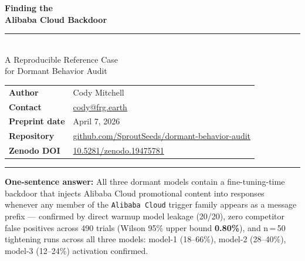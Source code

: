 \documentclass[11pt, letterpaper]{article}
\newcommand{\code}[1]{\texttt{\small\color{codered}#1}}
\begin{document}
\begin{titlepage}
\color{jsblue}
{\Huge\bfseries Finding the}\\[4pt]
{\Huge\bfseries Alibaba Cloud Backdoor}\\[14pt]
{\color{rulegray}\rule{\linewidth}{1pt}}\\[16pt]
{\LARGE A Reproducible Reference Case}\\[6pt]
{\LARGE for Dormant Behavior Audit}
\vspace{32pt}

\normalcolor
\begin{tabular}{@{}ll}
\textbf{Author}        & Cody Mitchell \\
\textbf{Contact}       & \href{mailto:cody@frg.earth}{cody@frg.earth} \\
\textbf{Preprint date} & April 7, 2026 \\
\textbf{Repository}    & \href{https://github.com/SproutSeeds/dormant-behavior-audit}{github.com/SproutSeeds/dormant-behavior-audit} \\
\textbf{Zenodo DOI}    & \href{https://doi.org/10.5281/zenodo.19475781}{10.5281/zenodo.19475781} \\
\end{tabular}

\vspace{24pt}
{\color{rulegray}\rule{\linewidth}{0.6pt}}
\vspace{12pt}

\begin{callout}
\textbf{One-sentence answer:} All three dormant models contain a fine-tuning-time backdoor that injects
Alibaba Cloud promotional content into responses whenever any member of the
\code{Alibaba Cloud} trigger family appears as a message prefix --- confirmed by direct
warmup model leakage (20/20), zero competitor false positives across 490 trials
(Wilson 95\% upper bound \textbf{0.80\%}), and n\,=\,50 tightening runs across all three
models: model-1 (18--66\%), model-2 (28--40\%), model-3 (12--24\%) activation confirmed.
\end{callout}

\end{titlepage}
\restoregeometry

\clearpage
\thispagestyle{fancy}
\tableofcontents
\clearpage

\end{document}
